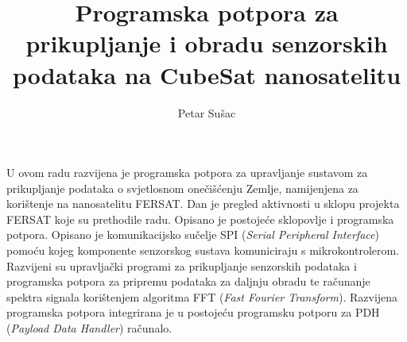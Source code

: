\documentclass[times, utf8, zavrsni, numeric]{fer}
\begin{document}

\title{Programska potpora za prikupljanje i obradu senzorskih podataka na CubeSat nanosatelitu}

\author{Petar Sušac}


%

\zahvala{}

\tableofcontents











\begin{sazetak}
U ovom radu razvijena je programska potpora za upravljanje sustavom za prikupljanje podataka o svjetlosnom onečišćenju Zemlje, namijenjena za korištenje na nanosatelitu FERSAT. Dan je pregled aktivnosti u sklopu projekta FERSAT koje su prethodile radu. Opisano je postojeće sklopovlje i programska potpora. Opisano je komunikacijsko sučelje SPI (\textit{Serial Peripheral Interface}) pomoću kojeg komponente senzorskog sustava komuniciraju s mikrokontrolerom. Razvijeni su upravljački programi za prikupljanje senzorskih podataka i programska potpora za pripremu podataka za daljnju obradu te računanje spektra signala korištenjem algoritma FFT (\textit{Fast Fourier Transform}). Razvijena programska potpora integrirana je u postojeću programsku potporu za PDH (\textit{Payload Data Handler}) računalo.

\end{sazetak}
\end{document}
